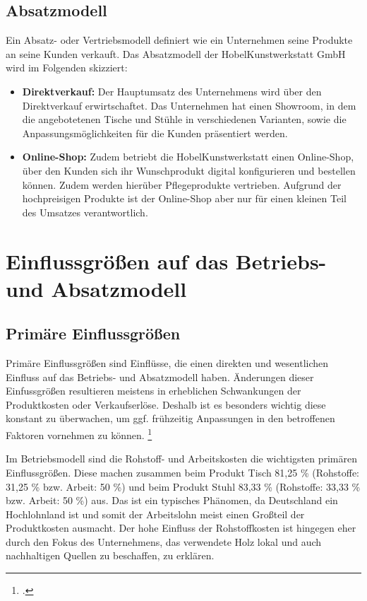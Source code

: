 \subsection{Absatzmodell}

Ein Absatz- oder Vertriebsmodell definiert wie ein Unternehmen seine Produkte an seine Kunden verkauft. Das Absatzmodell der HobelKunstwerkstatt GmbH wird im Folgenden skizziert:

\begin{itemize}
    \item \textbf{Direktverkauf:} Der Hauptumsatz des Unternehmens wird über den Direktverkauf erwirtschaftet. Das Unternehmen hat einen Showroom, in dem die angebotetenen Tische und Stühle in verschiedenen Varianten, sowie die Anpassungsmöglichkeiten für die Kunden präsentiert werden.
    \item \textbf{Online-Shop:} Zudem betriebt die HobelKunstwerkstatt einen Online-Shop, über den Kunden sich ihr Wunschprodukt digital konfigurieren und bestellen können. Zudem werden hierüber Pflegeprodukte vertrieben. Aufgrund der hochpreisigen Produkte ist der Online-Shop aber nur für einen kleinen Teil des Umsatzes verantwortlich.
\end{itemize}

\section{Einflussgrö{\ss}en auf das Betriebs- und Absatzmodell}

\subsection{Primäre Einflussgrö{\ss}en}

Primäre Einflussgrö{\ss}en sind Einflüsse, die einen direkten und wesentlichen Einfluss auf das Betriebs- und Absatzmodell haben. Änderungen dieser Einfussgrö{\ss}en resultieren meistens in erheblichen Schwankungen \zB der Produktkosten oder Verkaufserlöse. Deshalb ist es besonders wichtig diese konstant zu überwachen, um ggf. frühzeitig Anpassungen in den betroffenen Faktoren vornehmen zu können. \footcite[Vgl.][S. 67]{kupper1980interdependenzen}

Im Betriebsmodell sind die Rohstoff- und Arbeitskosten die wichtigsten primären Einflussgrö{\ss}en. Diese machen zusammen beim Produkt Tisch 81,25 \% (Rohstoffe: 31,25 \% bzw. Arbeit: 50 \%) und beim Produkt Stuhl 83,33 \% (Rohstoffe: 33,33 \% bzw. Arbeit: 50 \%) aus. Das ist ein typisches Phänomen, da Deutschland ein Hochlohnland ist und somit der Arbeitslohn meist einen Gro{\ss}teil der Produktkosten ausmacht. Der hohe Einfluss der Rohstoffkosten ist hingegen eher durch den Fokus des Unternehmens, das verwendete Holz lokal und auch nachhaltigen Quellen zu beschaffen, zu erklären.

